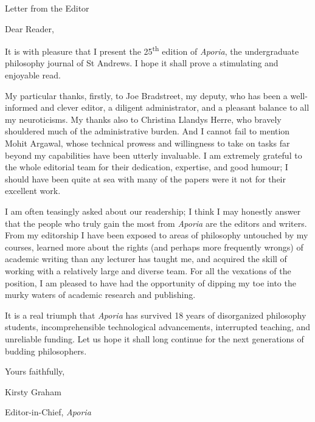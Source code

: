 \vspace*{\credgap}
{\noindent\LARGE\sc Letter from the Editor}
\vspace{\credgap}

\vspace{\ackgap}\noindent
Dear Reader,

\vspace{\credgap}\noindent
It is with pleasure that I present the 25\textsuperscript{th} edition
of \emph{Aporia}, the undergraduate philosophy journal of St Andrews.
I hope it shall prove a stimulating and enjoyable read.

My particular thanks, firstly, to Joe Bradstreet, my deputy, who has
been a well-informed and clever editor, a diligent administrator, and
a pleasant balance to all my neuroticisms. My thanks also to Christina
Llandys Herre, who bravely shouldered much of the administrative
burden.  And I cannot fail to mention Mohit Argawal, whose technical
prowess and willingness to take on tasks far beyond my capabilities
have been utterly invaluable. I am extremely grateful to the whole
editorial team for their dedication, expertise, and good humour; I
should have been quite at sea with many of the papers were it not for
their excellent work.

I am often teasingly asked about our readership; I think I may honestly
answer that the people who truly gain the most from \emph{Aporia} are
the editors and writers. From my editorship I have been exposed to areas
of philosophy untouched by my courses, learned more about the rights
(and perhaps more frequently wrongs) of academic writing than any
lecturer has taught me, and acquired the skill of working with a
relatively large and diverse team. For all the vexations of the
position, I am pleased to have had the opportunity of dipping my toe
into the murky waters of academic research and publishing.

It is a real triumph that \emph{Aporia} has survived 18 years of
disorganized philosophy students, incomprehensible technological
advancements, interrupted teaching, and unreliable funding. Let us hope
it shall long continue for the next generations of budding philosophers.

\vspace{\credgap}\noindent
Yours faithfully,

\vspace{\ackgap}\noindent
Kirsty Graham

\noindent
Editor-in-Chief, \emph{Aporia}
